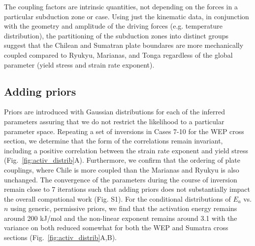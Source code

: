 \documentclass[12pt]{article}
\begin{document}
{The coupling factors are intrinsic quantities, not depending on the forces in a particular subduction zone or case.
Using just the kinematic data, in conjunction with the geometry and amplitude of the driving forces (e.g. temperature distribution),
the partitioning of the subduction zones into distinct groups  suggest that the Chilean and Sumatran plate boundares are more mechanically coupled compared to Ryukyu, Marianas, and Tonga regardless of the global parameter (yield stress and strain rate exponent).


\subsection{Adding priors}

Priors are introduced with Gaussian distributions for each of the inferred parameters assuring that we do not restrict the likelihood to a particular parameter space.  Repeating a set of inversions in Cases 7-10 for the WEP cross section, we determine that the form of the correlations remain invariant, including a positive correlation between the strain rate exponent and yield stress
(Fig.~\ref{fig:activ_distrib}A). Furthermore, we confirm that the ordering of plate couplings, where Chile is more coupled than the Marianas and Ryukyu is also unchanged. 
The convergence of the parameters during the course of inversion
remain close to 7 iterations such that adding priors does not substantially impact the overall computional work
(Fig. S1). 
For the conditional distributions of $E_a$ vs. $n$ using generic, permissive priors, we find that the 
activation energy remains around 200 kJ/mol and the non-linear
exponent remains around 3.1 with the variance on both reduced somewhat
for both the WEP and Sumatra cross sections
(Fig.~\ref{fig:activ_distrib}A,B).

}
\end{document}
